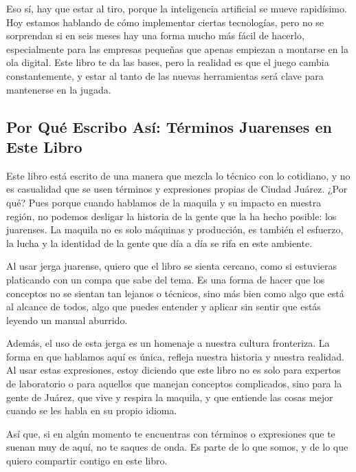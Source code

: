 \documentclass[
  10pt,
  letterpaper,
]{book}
\begin{document}
Eso sí, hay que estar al tiro, porque la inteligencia artificial se
mueve rapidísimo. Hoy estamos hablando de cómo implementar ciertas
tecnologías, pero no se sorprendan si en seis meses hay una forma mucho
más fácil de hacerlo, especialmente para las empresas pequeñas que
apenas empiezan a montarse en la ola digital. Este libro te da las
bases, pero la realidad es que el juego cambia constantemente, y estar
al tanto de las nuevas herramientas será clave para mantenerse en la
jugada.

\subsection*{Por Qué Escribo Así: Términos Juarenses en Este
Libro}\label{por-quuxe9-escribo-asuxed-tuxe9rminos-juarenses-en-este-libro}

Este libro está escrito de una manera que mezcla lo técnico con lo
cotidiano, y no es casualidad que se usen términos y expresiones propias
de Ciudad Juárez. ¿Por qué? Pues porque cuando hablamos de la maquila y
su impacto en nuestra región, no podemos desligar la historia de la
gente que la ha hecho posible: los juarenses. La maquila no es solo
máquinas y producción, es también el esfuerzo, la lucha y la identidad
de la gente que día a día se rifa en este ambiente.

Al usar jerga juarense, quiero que el libro se sienta cercano, como si
estuvieras platicando con un compa que sabe del tema. Es una forma de
hacer que los conceptos no se sientan tan lejanos o técnicos, sino más
bien como algo que está al alcance de todos, algo que puedes entender y
aplicar sin sentir que estás leyendo un manual aburrido.

Además, el uso de esta jerga es un homenaje a nuestra cultura
fronteriza. La forma en que hablamos aquí es única, refleja nuestra
historia y nuestra realidad. Al usar estas expresiones, estoy diciendo
que este libro no es solo para expertos de laboratorio o para aquellos
que manejan conceptos complicados, sino para la gente de Juárez, que
vive y respira la maquila, y que entiende las cosas mejor cuando se les
habla en su propio idioma.

Así que, si en algún momento te encuentras con términos o expresiones
que te suenan muy de aquí, no te saques de onda. Es parte de lo que
somos, y de lo que quiero compartir contigo en este libro.

\end{document}
